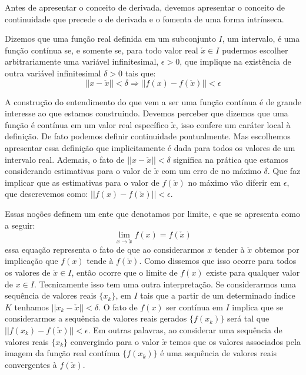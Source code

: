 \par Antes de apresentar o conceito de derivada, devemos apresentar o conceito de continuidade que precede o de derivada e o fomenta de uma forma intrínseca. 

\begin{definition}
  Dizemos que uma função real definida em um subconjunto $I$, um intervalo, é uma função contínua se, e somente se, para todo valor real $\check{x} \in I$ pudermos escolher arbitrariamente uma variável infinitesimal, $\epsilon > 0$, que implique na existência de outra variável infinitesimal $\delta>0$ tais que:
  \begin{equation}
    ||x - \check{x}|| < \delta \Rightarrow ||f(x) - f(\check{x})|| < \epsilon
  \end{equation}
\end{definition}

\par A construção do entendimento do que vem a ser uma função contínua é de grande interesse ao que estamos construindo. Devemos perceber que dizemos que uma função é contínua em um valor real específico $\check{x}$, isso confere um caráter local à definição. De fato podemos definir continuidade pontualmente. Mas escolhemos apresentar essa definição que implicitamente é dada para todos os valores de um intervalo real. Ademais, o fato de $||x - \check{x}|| < \delta$ significa na prática que estamos considerando estimativas para o valor de $\check{x}$ com um erro de no máximo $\delta$. Que faz implicar que as estimativas para o valor de $f(\check{x})$ no máximo vão diferir em $\epsilon$, que descrevemos como: $||f(x) - f(\check{x})|| < \epsilon$.

\par Essas noções definem um ente que denotamos por limite, e que se apresenta como a seguir:
\begin{equation}
  \lim_{x \rightarrow \check{x}}f(x)= f(\check{x})
\end{equation}
essa equação representa o fato de que ao considerarmos $x$ tender à $\check{x}$ obtemos por implicação que $f(x)$ tende à $f(\check{x})$. Como dissemos que isso ocorre para todos os valores de $\check{x} \in I$, então ocorre que o limite de $f(x)$ existe para qualquer valor de $x \in I$. Tecnicamente isso tem uma outra interpretação. Se considerarmos uma sequência de valores reais $\{x_k\}$, em $I$ tais que a partir de um determinado índice $K$ tenhamos $||x_k - \check{x}|| < \delta$. O fato de $f(x)$ ser contínua em $I$ implica que se considerarmos a sequência de valores reais gerados $\{f(x_k)\}$ será tal que $||f(x_k) - f(\check{x})|| < \epsilon$. Em outras palavras, ao considerar uma sequência de valores reais $\{x_k\}$ convergindo para o valor $\check{x}$ temos que os valores associados pela imagem da função real contínua $\{f(x_k)\}$ é uma sequência de valores reais convergentes à $f(\check{x})$.

